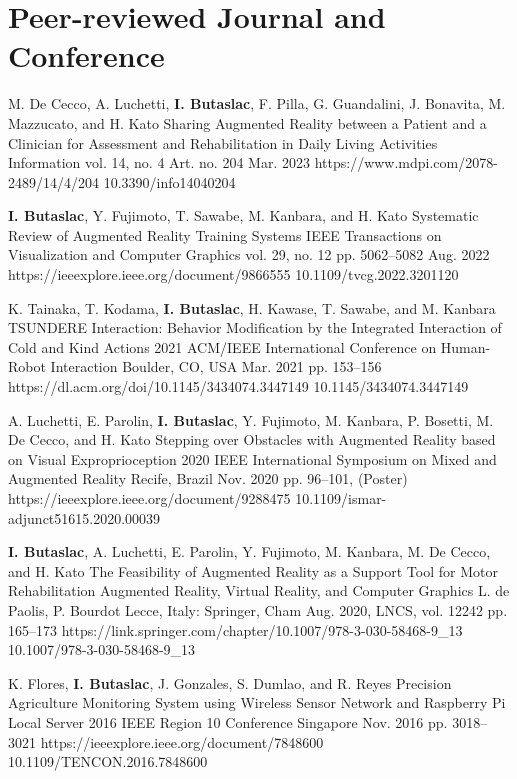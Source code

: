 \section{Peer-reviewed Journal and Conference}

\cvJournalListStart
\cvJournal
{M. De Cecco, A. Luchetti, \textbf{I. Butaslac}, F. Pilla, G. Guandalini, J. Bonavita, M. Mazzucato, and H. Kato}
{Sharing Augmented Reality between a Patient and a Clinician for Assessment and Rehabilitation in Daily Living Activities}
{Information}
{vol. 14, no. 4}
{Art. no. 204}
{Mar. 2023}
{https://www.mdpi.com/2078-2489/14/4/204}
{10.3390/info14040204}

\cvJournal
{\textbf{I. Butaslac}, Y. Fujimoto, T. Sawabe, M. Kanbara, and H. Kato}
{Systematic Review of Augmented Reality Training Systems}
{IEEE Transactions on Visualization and Computer Graphics}
{vol. 29, no. 12}
{pp. 5062--5082}
{Aug. 2022}
{https://ieeexplore.ieee.org/document/9866555}
{10.1109/tvcg.2022.3201120}
\cvJournalListEnd

\cvConfListStart
\cvConference
{K. Tainaka, T. Kodama, \textbf{I. Butaslac}, H. Kawase, T. Sawabe, and M. Kanbara}
{TSUNDERE Interaction: Behavior Modification by the Integrated Interaction of Cold and Kind Actions}
{2021 ACM/IEEE International Conference on Human-Robot Interaction}
{Boulder, CO, USA}
{Mar. 2021}
{pp. 153--156}
{https://dl.acm.org/doi/10.1145/3434074.3447149}
{10.1145/3434074.3447149}

\cvConference
{A. Luchetti, E. Parolin, \textbf{I. Butaslac}, Y. Fujimoto, M. Kanbara, P. Bosetti, M. De Cecco, and H. Kato}
{Stepping over Obstacles with Augmented Reality based on Visual Exproprioception}
{2020 IEEE International Symposium on Mixed and Augmented Reality}
{Recife, Brazil}
{Nov. 2020}
{pp. 96--101, (Poster)}
{https://ieeexplore.ieee.org/document/9288475}
{10.1109/ismar-adjunct51615.2020.00039}

\cvConferenceEditor
{\textbf{I. Butaslac}, A. Luchetti, E. Parolin, Y. Fujimoto, M. Kanbara, M. De Cecco, and H. Kato}
{The Feasibility of Augmented Reality as a Support Tool for Motor Rehabilitation}
{Augmented Reality, Virtual Reality, and Computer Graphics}
{L. de Paolis, P. Bourdot}
{Lecce, Italy: Springer, Cham}
{Aug. 2020, LNCS, vol. 12242}
{pp. 165--173}
{https://link.springer.com/chapter/10.1007/978-3-030-58468-9_13}
{10.1007/978-3-030-58468-9\_13}

\cvConference
{K. Flores, \textbf{I. Butaslac}, J. Gonzales, S. Dumlao, and R. Reyes}
{Precision Agriculture Monitoring System using Wireless Sensor Network and Raspberry Pi Local Server}
{2016 IEEE Region 10 Conference}
{Singapore}
{Nov. 2016}
{pp. 3018--3021}
{https://ieeexplore.ieee.org/document/7848600}
{10.1109/TENCON.2016.7848600}
\cvConfListEnd

